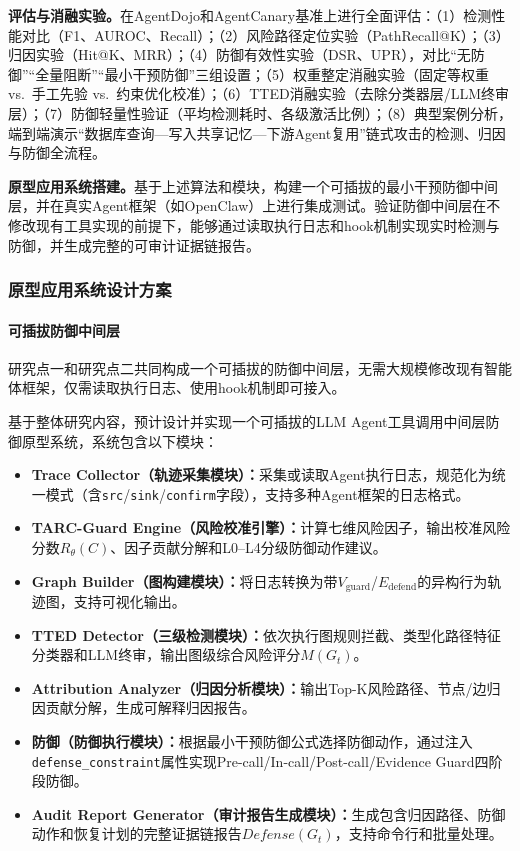 \textbf{评估与消融实验。}在AgentDojo和AgentCanary基准上进行全面评估：（1）检测性能对比（F1、AUROC、Recall）；（2）风险路径定位实验（PathRecall@K）；（3）归因实验（Hit@K、MRR）；（4）防御有效性实验（DSR、UPR），对比“无防御”“全量阻断”“最小干预防御”三组设置；（5）权重整定消融实验（固定等权重 vs.\ 手工先验 vs.\ 约束优化校准）；（6）TTED消融实验（去除分类器层/LLM终审层）；（7）防御轻量性验证（平均检测耗时、各级激活比例）；（8）典型案例分析，端到端演示“数据库查询—写入共享记忆—下游Agent复用”链式攻击的检测、归因与防御全流程。

\textbf{原型应用系统搭建。}基于上述算法和模块，构建一个可插拔的最小干预防御中间层，并在真实Agent框架（如OpenClaw）上进行集成测试。验证防御中间层在不修改现有工具实现的前提下，能够通过读取执行日志和hook机制实现实时检测与防御，并生成完整的可审计证据链报告。

\subsubsection{原型应用系统设计方案}

\paragraph{可插拔防御中间层}
研究点一和研究点二共同构成一个可插拔的防御中间层，无需大规模修改现有智能体框架，仅需读取执行日志、使用hook机制即可接入。

基于整体研究内容，预计设计并实现一个可插拔的LLM Agent工具调用中间层防御原型系统，系统包含以下模块：

\begin{itemize}[leftmargin=2em,itemsep=0pt]
  \item \textbf{Trace Collector（轨迹采集模块）：}采集或读取Agent执行日志，规范化为统一模式（含\texttt{src}/\texttt{sink}/\texttt{confirm}字段），支持多种Agent框架的日志格式。
  \item \textbf{TARC-Guard Engine（风险校准引擎）：}计算七维风险因子，输出校准风险分数$R_\theta(C)$、因子贡献分解和L0--L4分级防御动作建议。
  \item \textbf{Graph Builder（图构建模块）：}将日志转换为带$V_{\text{guard}}$/$E_{\text{defend}}$的异构行为轨迹图，支持可视化输出。
  \item \textbf{TTED Detector（三级检测模块）：}依次执行图规则拦截、类型化路径特征分类器和LLM终审，输出图级综合风险评分$M(G_t)$。
  \item \textbf{Attribution Analyzer（归因分析模块）：}输出Top-K风险路径、节点/边归因贡献分解，生成可解释归因报告。
  \item \textbf{防御（防御执行模块）：}根据最小干预防御公式选择防御动作，通过注入\texttt{defense\_constraint}属性实现Pre-call/In-call/Post-call/Evidence Guard四阶段防御。
  \item \textbf{Audit Report Generator（审计报告生成模块）：}生成包含归因路径、防御动作和恢复计划的完整证据链报告$Defense(G_t)$，支持命令行和批量处理。
\end{itemize}

